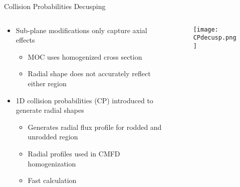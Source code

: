 \begin{frame}[t]{Collision Probabilities Decusping}
    
    \begin{columns}
        \begin{column}{0.45\textwidth}
            \begin{itemize}
                \item Sub-plane modifications only capture axial effects
                \begin{itemize}
                    \item MOC uses homogenized cross section
                    \item Radial shape does not accurately reflect either region
                \end{itemize}
                \item 1D collision probabilities (CP) introduced to generate radial 
                shapes
                \begin{itemize}
                    \item Generates radial flux profile for rodded and unrodded region
                    \item Radial profiles used in CMFD homogenization
                    \item Fast calculation
                \end{itemize}
            \end{itemize}
        \end{column}
        \begin{column}{0.55\textwidth}
            \begin{figure}[h]
                \centering
                \texttt{[image: CPdecusp.png]}
            \end{figure}
        \end{column}
    \end{columns}
    
\end{frame}



